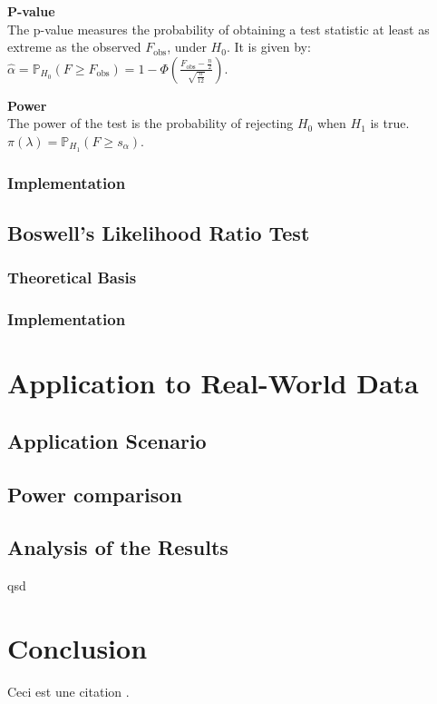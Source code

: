 \documentclass{journalstyle}
\begin{document}
\noindent\textbf{P-value} \\
The p-value measures the probability of obtaining a test statistic at least as extreme as the observed $F_{\text{obs}}$, under $H_0$.
It is given by: \\
$\hat{\alpha} = \mathbb{P}_{H_0}(F \geq F_{\text{obs}}) = 1 - \Phi(\frac{F_{\text{obs}} - \frac{n}{2}}{\sqrt{\frac{n}{12}}})$.

\noindent\textbf{Power} \\
The power of the test is the probability of rejecting $H_0$ when $H_1$ is true. \\
$\pi(\lambda) = \mathbb{P}_{H_1}(F \geq s_{\alpha})$.


\subsubsection{Implementation}


\subsection{Boswell's Likelihood Ratio Test}

\subsubsection{Theoretical Basis}

\subsubsection{Implementation}


\section{Application to Real-World Data}

\subsection{Application Scenario}

\subsection{Power comparison}

\subsection{Analysis of the Results}

\newpage qsd



\section{Conclusion}
Ceci est une citation \cite{smith2020example}.



\printbibliography
\end{document}
